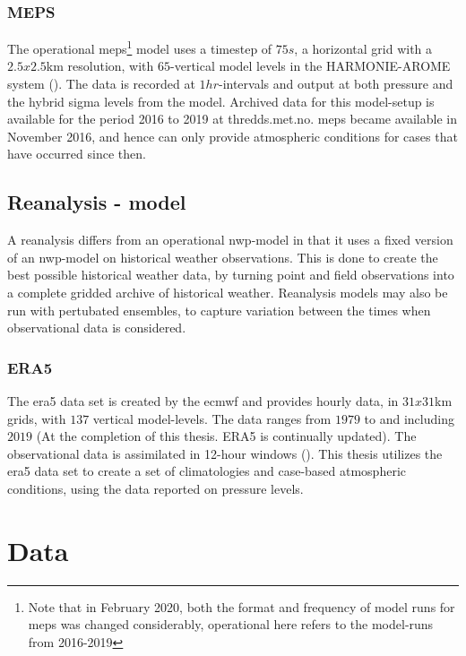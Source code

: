 \subsubsection{MEPS}\label{sec:meps}
The operational \acrfull{meps}\footnote{Note that in February 2020, both the format and frequency of model runs for \acrfull{meps} was changed considerably, operational here refers to the model-runs from 2016-2019} model uses a timestep of $75s$, a horizontal grid with a $2.5x2.5$km resolution, with $65$-vertical model levels in the HARMONIE-AROME system (\cite{bengtsson2017}). The data is recorded at $1hr$-intervals and output at both pressure and the hybrid sigma levels from the model. Archived data for this model-setup is available for the period 2016 to 2019 at thredds.met.no. \acrshort{meps} became available in November 2016, and hence can only provide atmospheric conditions for cases that have occurred since then. 

\subsection{Reanalysis - model}\label{sec:ra}

A reanalysis differs from an operational \acrshort{nwp}-model in that it uses a fixed version of an \acrshort{nwp}-model on historical weather observations. This is done to create the best possible historical weather data, by turning point and field observations into a complete gridded archive of historical weather. Reanalysis models may also be run with pertubated ensembles, to capture variation between the times when observational data is considered.

\subsubsection{ERA5}\label{sec:era5}
The \acrfull{era5} data set is created by the \acrfull{ecmwf} and provides hourly data, in $31x31$km grids, with $137$ vertical model-levels. The data ranges from $1979$ to and including $2019$ (At the completion of this thesis. ERA5 is continually updated). The observational data is assimilated in 12-hour windows (\cite{hersbach2018}). This thesis utilizes the \acrshort{era5} data set to create a set of climatologies and case-based atmospheric conditions, using the data reported on pressure levels.

\section{Data}\label{sec:data}

